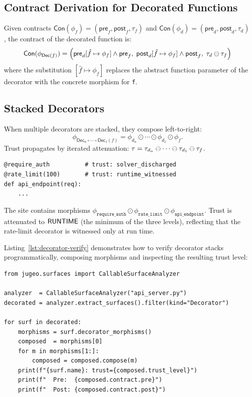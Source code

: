\documentclass[11pt]{article}
\newcommand{\Decor}{\mathsf{Dec}}              %
\newcommand{\Contract}{\mathsf{Con}}           %
\newcommand{\Pre}{\mathsf{pre}}                %
\newcommand{\Post}{\mathsf{post}}              %
\newcommand{\compose}{\mathbin{\odot}}         %
\begin{document}
\subsection{Contract Derivation for Decorated Functions}

\begin{construction}\label{const:decorcon}
Given contracts $\Contract(\phi_f) = (\Pre_f, \Post_f, \tau_f)$ and
$\Contract(\phi_d) = (\Pre_d, \Post_d, \tau_d)$, the contract of the
decorated function is:
\[
  \Contract(\phi_{\Decor(f)}) =
    \Bigl(\Pre_d[\hat{f} \mapsto \phi_f] \wedge \Pre_f,\;
          \Post_d[\hat{f} \mapsto \phi_f] \wedge \Post_f,\;
          \tau_d \tatten \tau_f\Bigr)
\]
where the substitution $[\hat{f} \mapsto \phi_f]$ replaces the
abstract function parameter of the decorator with the concrete
morphism for \texttt{f}.
\end{construction}

\subsection{Stacked Decorators}

When multiple decorators are stacked, they compose left-to-right:
\[
  \phi_{\Decor_n \circ \cdots \circ \Decor_1(f)} =
  \phi_{d_n} \compose \cdots \compose \phi_{d_1} \compose \phi_f.
\]
Trust propagates by iterated attenuation:
$\tau = \tau_{d_n} \ominus \cdots \ominus \tau_{d_1} \ominus \tau_f$.

\begin{example}\label{ex:stackeddec}
\begin{lstlisting}[style=jugeo-python]
@require_auth          # trust: solver_discharged
@rate_limit(100)       # trust: runtime_witnessed
def api_endpoint(req):
    ...
\end{lstlisting}
The site contains morphisms
$\phi_{\texttt{require\_auth}} \compose \phi_{\texttt{rate\_limit}} \compose
\phi_{\texttt{api\_endpoint}}$.
Trust is attenuated to $\mathsf{RUNTIME}$ (the minimum of the three
levels), reflecting that the rate-limit decorator is witnessed only
at run time.
\end{example}

Listing~\ref{lst:decorator-verify} demonstrates how to verify
decorator stacks programmatically, composing morphisms and inspecting
the resulting trust level:

\begin{lstlisting}[style=jugeo-python,
  caption={Verifying decorator stacks and computing contract
           composition via the \textsc{CallSurf} API.},
  label={lst:decorator-verify}]
from jugeo.surfaces import CallableSurfaceAnalyzer

analyzer  = CallableSurfaceAnalyzer("api_server.py")
decorated = analyzer.extract_surfaces().filter(kind="Decorator")

for surf in decorated:
    morphisms = surf.decorator_morphisms()
    composed  = morphisms[0]
    for m in morphisms[1:]:
        composed = composed.compose(m)
    print(f"{surf.name}: trust={composed.trust_level}")
    print(f"  Pre:  {composed.contract.pre}")
    print(f"  Post: {composed.contract.post}")
\end{lstlisting}
\end{document}
